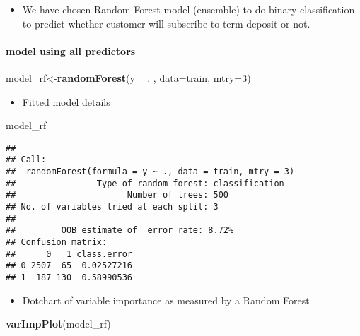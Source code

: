 \documentclass[
]{article}
\newenvironment{Shaded}{\begin{snugshade}}{\end{snugshade}}
\newcommand{\DataTypeTok}[1]{\textcolor[rgb]{0.13,0.29,0.53}{#1}}
\newcommand{\DecValTok}[1]{\textcolor[rgb]{0.00,0.00,0.81}{#1}}
\newcommand{\KeywordTok}[1]{\textcolor[rgb]{0.13,0.29,0.53}{\textbf{#1}}}
\newcommand{\NormalTok}[1]{#1}
\newcommand{\OperatorTok}[1]{\textcolor[rgb]{0.81,0.36,0.00}{\textbf{#1}}}
\newcommand{\StringTok}[1]{\textcolor[rgb]{0.31,0.60,0.02}{#1}}
\providecommand{\tightlist}{%
  \setlength{\itemsep}{0pt}\setlength{\parskip}{0pt}}
\begin{document}
\begin{itemize}
\tightlist
\item
  We have chosen Random Forest model (ensemble) to do binary
  classification to predict whether customer will subscribe to term
  deposit or not.
\end{itemize}

\hypertarget{model-using-all-predictors}{%
\paragraph{model using all
predictors}\label{model-using-all-predictors}}

\begin{Shaded}
\begin{Highlighting}[]
\NormalTok{model_rf<-}\KeywordTok{randomForest}\NormalTok{(y }\OperatorTok{~}\StringTok{ }\NormalTok{.  , }\DataTypeTok{data=}\NormalTok{train, }\DataTypeTok{mtry=}\DecValTok{3}\NormalTok{)}
\end{Highlighting}
\end{Shaded}

\begin{itemize}
\tightlist
\item
  Fitted model details
\end{itemize}

\begin{Shaded}
\begin{Highlighting}[]
\NormalTok{model_rf}
\end{Highlighting}
\end{Shaded}

\begin{verbatim}
## 
## Call:
##  randomForest(formula = y ~ ., data = train, mtry = 3) 
##                Type of random forest: classification
##                      Number of trees: 500
## No. of variables tried at each split: 3
## 
##         OOB estimate of  error rate: 8.72%
## Confusion matrix:
##      0   1 class.error
## 0 2507  65  0.02527216
## 1  187 130  0.58990536
\end{verbatim}

\begin{itemize}
\tightlist
\item
  Dotchart of variable importance as measured by a Random Forest
\end{itemize}

\begin{Shaded}
\begin{Highlighting}[]
\KeywordTok{varImpPlot}\NormalTok{(model_rf)}
\end{Highlighting}
\end{Shaded}
\end{document}
